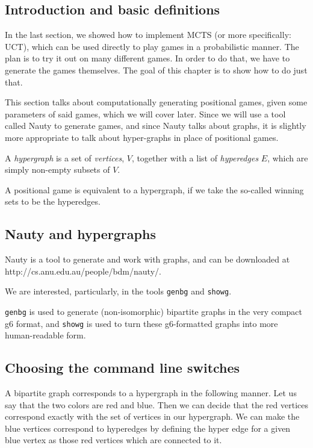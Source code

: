\subsection{Introduction and basic definitions}

In the last section, we showed how to implement MCTS (or more specifically: UCT), which can be used directly to play games in a probabilistic manner.
The plan is to try it out on many different games.
In order to do that, we have to generate the games themselves.
The goal of this chapter is to show how to do just that.

This section talks about computationally generating positional games, given some parameters of said games, which we will cover later.
Since we will use a tool called Nauty to generate games, and since Nauty talks about graphs, it is slightly more appropriate to talk about hyper-graphs in place of positional games.

\begin{definition}
  A \emph{hypergraph} is a set of \emph{vertices}, $V$, together with a list of \emph{hyperedges} $E$, which are simply non-empty subsets of $V$.
\end{definition}


A positional game is equivalent to a hypergraph, if we take the so-called winning sets to be the hyperedges.



\subsection{Nauty and hypergraphs}


Nauty is a tool to generate and work with graphs, and can be downloaded at http://cs.anu.edu.au/people/bdm/nauty/.

We are interested, particularly, in the tools \texttt{genbg} and \texttt{showg}.

\texttt{genbg} is used to generate (non-isomorphic) bipartite graphs in the very compact g6 format, and \texttt{showg} is used to turn these g6-formatted graphs into more human-readable form.


\subsection{Choosing the command line switches}
\label{sec:nautycommandline}

A bipartite graph corresponds to a hypergraph in the following manner.
Let us say that the two colors are red and blue. Then we can decide that the red vertices correspond exactly with the set of vertices in our hypergraph.
We can make the blue vertices correspond to hyperedges by defining the hyper edge for a given blue vertex as those red vertices which are connected to it.



